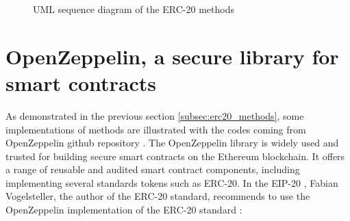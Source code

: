 \begin{figure}[!h]
    \caption{UML sequence diagram of the ERC-20 methods}
    \label{fig:uml_erc20_methods}
\end{figure}



\section{OpenZeppelin, a secure library for smart contracts}
\label{sec:ch2_openzeppelin}

As demonstrated in the previous section \ref{subsec:erc20_methods}, some implementations of methods are illustrated with the codes coming from OpenZeppelin github repository \cite{openzeppelin_github}. The
OpenZeppelin library is widely used and trusted for building secure smart contracts on the Ethereum blockchain. It offers a range of reusable and audited smart contract components, including
implementing several standards tokens such as ERC-20. In the EIP-20 \cite{eth_erc20}, Fabian Vogelsteller, the author of the ERC-20 standard, recommends to use the OpenZeppelin implementation of the ERC-20 standard
\cite{openzeppelin_erc20}:


